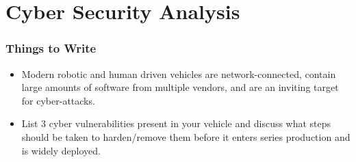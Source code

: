 \section{Cyber Security Analysis}
\subsubsection*{Things to Write}

\begin{itemize}
  \item Modern robotic and human driven vehicles are network-connected, contain large amounts of software from multiple vendors, and are an inviting target for cyber-attacks.
  \item List 3 cyber vulnerabilities present in your vehicle and discuss what steps should be taken to harden/remove them before it enters series production and is widely deployed.
\end{itemize}
